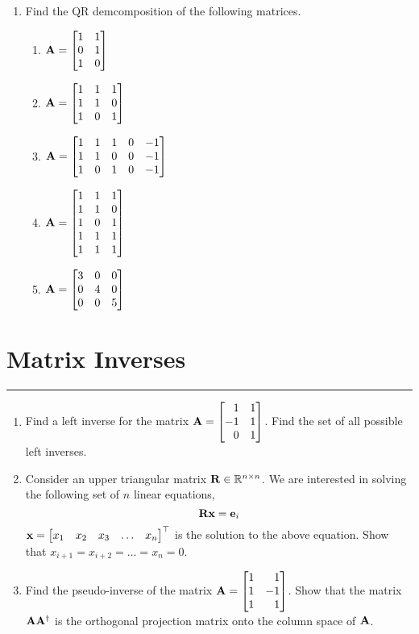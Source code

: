 \documentclass[
10pt, %
a4paper, %
oneside, %
headinclude,footinclude, %
BCOR5mm, %
]{scrartcl}
\def\mf{\ensuremath\mathbf}
\def\mb{\ensuremath\mathbb}
\def\bmx{\ensuremath\begin{bmatrix*}[r]}
\def\emx{\ensuremath\end{bmatrix*}}
\def\bmxc{\ensuremath\begin{bmatrix*}[c]}
\begin{document}
\begin{enumerate}
	\item Find the QR demcomposition of the following matrices.
	\begin{enumerate}
		\item $\mf{A} = \bmx 1 & 1 \\ 0 & 1 \\ 1 & 0 \emx$
		\item $\mf{A} = \bmx 1 & 1 & 1 \\ 1 & 1 & 0 \\ 1 & 0 & 1 \emx$
		\item $\mf{A} = \bmx 1 & 1 & 1 & 0 & -1 \\ 1 & 1 & 0 & 0 & -1\\ 1 & 0 & 1 & 0 & -1\emx$
		\item $\mf{A} = \bmx 1 & 1 & 1 \\ 1 & 1 & 0 \\ 1 & 0 & 1 \\ 1 & 1 & 1 \\ 1 & 1 & 1 \emx$
		\item $\mf{A} = \bmx 3 & 0 & 0 \\ 0 & 4 & 0 \\ 0 & 0 & 5 \emx$
	\end{enumerate}
\end{enumerate}


\newpage
\section{Matrix Inverses}
\hrule
\vspace{0.5cm}

\begin{enumerate}
	\item Find a left inverse for the matrix $\mf{A} = \bmx 1 & 1 \\ -1 & 1 \\ 0 & 1\emx$. Find the set of all possible left inverses. 
	
	
	\item Consider an upper triangular matrix $\mf{R} \in \mb{R}^{n \times n}$. We are interested in solving the following set of $n$ linear equations,
	\[ \mf{R} \mf{x} = \mf{e}_i \]
	$\mf{x} = \bmxc x_1 & x_2 & x_3 & \ldots & x_n \emx^\top$ is the solution to the above equation. Show that $x_{i+1} = x_{i+2} = \ldots = x_n = 0$.


	\item Find the pseudo-inverse of the matrix $\mf{A} = \bmx 1 & 1 \\ 1 & -1 \\ 1 & 1 \emx$. Show that the matrix $\mf{A}\mf{A}^\dagger$ is the orthogonal projection matrix onto the column space of $\mf{A}$.
\end{enumerate}
\end{document}
